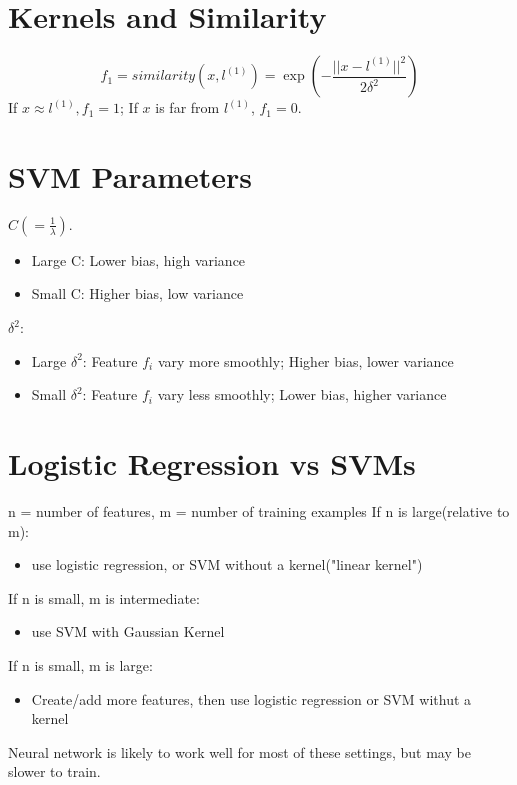\documentclass[11pt]{article}
\begin{document}
	\section{Kernels and Similarity}
		$$f_1=similarity(x, l^{(1)}) = \exp(-\frac{|| x- l^{(1)}|| ^2}{2\delta ^ 2})$$
		If $x\approx l^{(1)}, f_1 = 1$; If $x$ is far from $l^{(1)}$, $f_1=0$.
	\section{SVM Parameters}
		$C(=\frac{1}{\lambda})$.
		\begin{itemize}
			\item Large C: Lower bias, high variance
			\item Small C: Higher bias, low variance
		\end{itemize}
		$\delta ^ 2$:
		\begin{itemize}
			\item Large $\delta ^ 2$: Feature $f_i$ vary more smoothly; Higher bias, lower variance
			\item Small $\delta ^ 2$: Feature $f_i$ vary less smoothly; Lower bias, higher variance
		\end{itemize}
	\section{Logistic Regression vs SVMs}
		n = number of features, m = number of training examples
		If n is large(relative to m):
		\begin{itemize}
			\item use logistic regression, or SVM without a kernel("linear kernel")
		\end{itemize}
		If n is small, m is intermediate:
		\begin{itemize}
			\item use SVM with Gaussian Kernel
		\end{itemize}
		If n is small, m is large:
		\begin{itemize}
			\item Create/add more features, then use logistic regression or SVM withut a kernel
		\end{itemize}
		
		Neural network is likely to work well for most of these settings, but may be slower to train.
\end{document}
